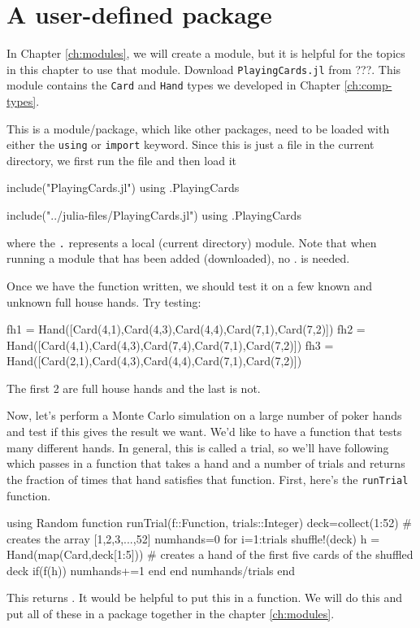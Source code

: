 \section{A user-defined package}

In Chapter \ref{ch:modules}, we will create a module, but it is helpful for the topics in this chapter to use that module.  Download \texttt{PlayingCards.jl} from ???.  This module contains the \verb!Card! and \verb!Hand! types we developed in Chapter \ref{ch:comp-types}.  

This is a module/package, which like other packages, need to be loaded	
with either the \texttt{using} or \texttt{import} keyword. Since this is
just a file in the current directory, we first run the file and then
load it

\begin{jlverbatim}
include("PlayingCards.jl")
using .PlayingCards
\end{jlverbatim}
\begin{jlcode}[poker]
include("../julia-files/PlayingCards.jl")
using .PlayingCards
\end{jlcode}

%
where the \texttt{.} represents a local (current directory) module.  Note that when running a module that has been added (downloaded), no . is needed.  



Once we have the function written, we should test it on a few known and
unknown full house hands. Try testing:
%
\begin{jlblock}[poker]
fh1 = Hand([Card(4,1),Card(4,3),Card(4,4),Card(7,1),Card(7,2)])
fh2 = Hand([Card(4,1),Card(4,3),Card(7,4),Card(7,1),Card(7,2)])
fh3 = Hand([Card(2,1),Card(4,3),Card(4,4),Card(7,1),Card(7,2)])
\end{jlblock}
%
The first 2 are full house hands and the last is not.


Now, let's perform a Monte Carlo simulation on a large number of poker
hands and test if this gives the result we want.  We'd like to have a function that tests many different hands.  In general, this is called a trial, so we'll have following which passes in a function that takes a hand and a number of trials and returns the fraction of times that hand satisfies that function.  First, here's the \verb!runTrial! function. 

\begin{jlblock}[poker]
using Random
function runTrial(f::Function, trials::Integer)
  deck=collect(1:52) # creates the array [1,2,3,...,52]
  numhands=0
  for i=1:trials
    shuffle!(deck)
    h = Hand(map(Card,deck[1:5]))  # creates a hand of the first five cards of the shuffled deck
    if(f(h))
        numhands+=1
    end
  end
  numhands/trials
end
\end{jlblock}


%
This returns  \printpythontex[verb]. 
It would be helpful to put this in a function. We will do this and put all
of these in a package together in the chapter \ref{ch:modules}. 
